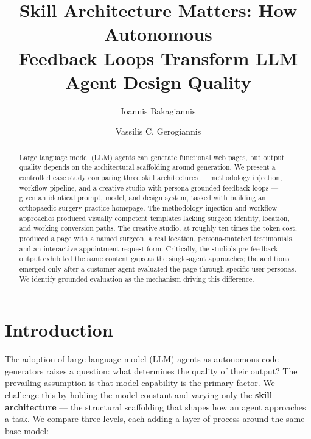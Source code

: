 \documentclass[a4paper]{llncs}
\begin{document}
\title{Skill Architecture Matters: How Autonomous\\ Feedback Loops Transform LLM Agent Design Quality}

\author{Ioannis Bakagiannis \and Vassilis C. Gerogiannis}


\maketitle
\thispagestyle{empty}

\begin{abstract}
Large language model (LLM) agents can generate functional web pages, but
output quality depends on the architectural scaffolding around generation.
We present a controlled case study comparing three skill architectures ---
methodology injection, workflow pipeline, and a creative studio with
persona-grounded feedback loops --- given an identical prompt, model, and
design system, tasked with building an orthopaedic surgery practice
homepage. The methodology-injection and workflow approaches produced
visually competent templates lacking surgeon identity, location, and
working conversion paths. The creative studio, at roughly ten times the
token cost, produced a page with a named surgeon, a real location,
persona-matched testimonials, and an interactive appointment-request form.
Critically, the studio's pre-feedback output exhibited the same content
gaps as the single-agent approaches; the additions emerged only after a
customer agent evaluated the page through specific user personas. We
identify grounded evaluation as the mechanism driving this difference.

\end{abstract}

\section{Introduction}
\label{sec:intro}

The adoption of large language model (LLM) agents as autonomous code
generators raises a question: what determines the quality of their output? The
prevailing assumption is that model capability is the primary factor. We
challenge this by holding the model constant and varying only the
\textbf{skill architecture} --- the structural scaffolding that shapes how an
agent approaches a task. We compare three levels, each adding a layer of
process around the same base model:
\end{document}
